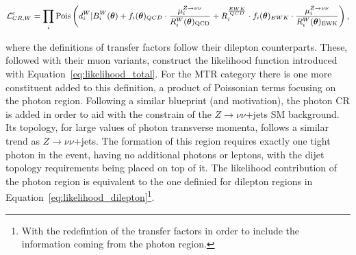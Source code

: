 \begin{equation}
\small{
    \mathcal{L}_{CR,W}^{e} = \prod_{i} \mathrm{Pois} \left(d^{W}_{i}|B^{W}_{i}(\boldsymbol{\theta}) + f_i(\boldsymbol{\theta})_{QCD} \cdot \frac{\mu_i^{Z\rightarrow \nu\nu}}{R^{W}_{i} (\boldsymbol{\theta})_{\mathrm{QCD}}} + R^{\frac{EWK}{QCD}}_{i} \cdot f_i(\boldsymbol{\theta})_{EWK} \cdot \frac{\mu_i^{Z\rightarrow \nu\nu} }{R^{W}_{i} (\boldsymbol{\theta})_{\mathrm{EWK}}} \right),}
    \label{eq:likelihood_singlelep}
\end{equation}

where the definitions of transfer factors follow their dilepton counterparts. These, followed with their muon variants, construct the likelihood function introduced with Equation~\ref{eq:likelihood_total}. For the MTR category there is one more constituent added to this definition, a product of Poissonian terms focusing on the photon region. Following a similar blueprint (and motivation), the photon CR is added in order to aid with the constrain of the $Z\rightarrow \nu\nu$+jets SM background. Its topology, for large values of photon transverse momenta, follows a similar trend as $Z\rightarrow \nu\nu$+jets. The formation of this region requires exactly one tight photon in the event, having no additional photons or leptons, with the dijet topology requirements being placed on top of it. The likelihood contribution of the photon region is equivalent to the one definied for dilepton regions in Equation~\ref{eq:likelihood_dilepton}\footnote{With the redefintion of the transfer factors in order to include the information coming from the photon region.}.



